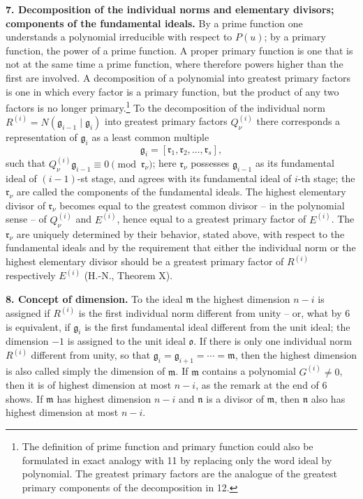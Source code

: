 \documentclass[11pt]{article}
\providecommand{\frakm}{\mathfrak m}
\providecommand{\frakn}{\mathfrak n}
\providecommand{\frakr}{\mathfrak r}
\providecommand{\frakg}{\mathfrak g}
\providecommand{\frako}{\mathfrak o}
\begin{document}
\textbf{7. Decomposition of the individual norms and elementary divisors; components of the fundamental ideals.} By a prime function one understands a polynomial irreducible with respect to $P(u)$; by a primary function, the power of a prime function. A proper primary function is one that is not at the same time a prime function, where therefore powers higher than the first are involved. A decomposition of a polynomial into greatest primary factors is one in which every factor is a primary function, but the product of any two factors is no longer primary.\footnote{The definition of prime function and primary function could also be formulated in exact analogy with 11 by replacing only the word ideal by polynomial. The greatest primary factors are the analogue of the greatest primary components of the decomposition in 12.} To the decomposition of the individual norm $R^{(i)}=N(\frakg_{i-1}\mid\frakg_i)$ into greatest primary factors $Q_\nu^{(i)}$ there corresponds a representation of $\frakg_i$ as a least common multiple
\[
 \frakg_i=[\frakr_1,\frakr_2,\ldots,\frakr_s],
\]
such that $Q_\nu^{(i)}\frakg_{i-1}\equiv0\pmod{\frakr_\nu}$; here $\frakr_\nu$ possesses $\frakg_{i-1}$ as its fundamental ideal of $(i-1)$-st stage, and agrees with its fundamental ideal of $i$-th stage; the $\frakr_\nu$ are called the components of the fundamental ideals. The highest elementary divisor of $\frakr_\nu$ becomes equal to the greatest common divisor -- in the polynomial sense -- of $Q_\nu^{(i)}$ and $E^{(i)}$, hence equal to a greatest primary factor of $E^{(i)}$. The $\frakr_\nu$ are uniquely determined by their behavior, stated above, with respect to the fundamental ideals and by the requirement that either the individual norm or the highest elementary divisor should be a greatest primary factor of $R^{(i)}$ respectively $E^{(i)}$ (H.-N., Theorem X).

\textbf{8. Concept of dimension.} To the ideal $\frakm$ the highest dimension $n-i$ is assigned if $R^{(i)}$ is the first individual norm different from unity -- or, what by 6 is equivalent, if $\frakg_i$ is the first fundamental ideal different from the unit ideal; the dimension $-1$ is assigned to the unit ideal $\frako$. If there is only one individual norm $R^{(i)}$ different from unity, so that $\frakg_i=\frakg_{i+1}=\cdots=\frakm$, then the highest dimension is also called simply the dimension of $\frakm$. If $\frakm$ contains a polynomial $G^{(i)}\ne0$, then it is of highest dimension at most $n-i$, as the remark at the end of 6 shows. If $\frakm$ has highest dimension $n-i$ and $\frakn$ is a divisor of $\frakm$, then $\frakn$ also has highest dimension at most $n-i$.
\end{document}
